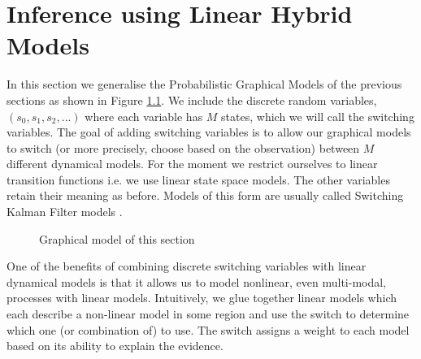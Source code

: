 \chapter{Inference using Linear Hybrid Models}
\label{sec_inf_lin_hybrid}
In this section we generalise the Probabilistic Graphical Models of the previous sections as shown in Figure \ref{fig_hybridmod1}. We include the discrete random variables, $(s_0,s_1, s_2,...)$ where each variable has $M$ states, which we will call the switching variables. The goal of adding switching variables is to allow our graphical models to switch (or more precisely, choose based on the observation) between $M$ different dynamical models. For the moment we restrict ourselves to linear transition functions i.e. we use linear state space models. The other variables retain their meaning as before. Models of this form are usually called Switching Kalman Filter models \cite{murphy1}. 
\begin{figure}[H] 
\centering
{}
\caption{Graphical model of this section}
\label{fig_hybridmod1}
\end{figure}
One of the benefits of combining discrete switching variables with linear dynamical models is that it allows us to model nonlinear, even multi-modal, processes with linear models. Intuitively, we glue together linear models which each describe a non-linear model in some region and use the switch to determine which one (or combination of) to use. The switch assigns a weight to each model based on its ability to explain the evidence. 

